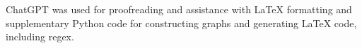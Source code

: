 \label{acknowledgements}

ChatGPT was used for proofreading and assistance with \LaTeX{} formatting and
supplementary Python code for constructing graphs and generating \LaTeX{} code,
including regex. 